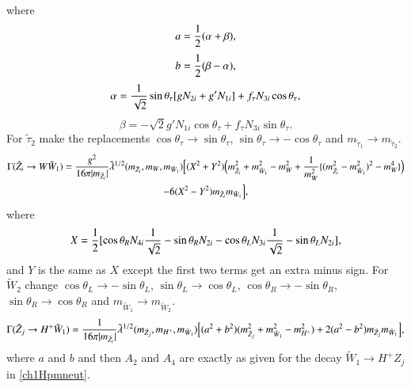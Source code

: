 \documentclass[final,3p,times]{elsarticle}
\begin{document}
where
\begin{equation}
a = {1 \over 2} (\alpha + \beta) ,
\end{equation}
\begin{equation}
b = {1 \over 2} (\beta - \alpha) ,
\end{equation}
\begin{equation}
\alpha = {1 \over \sqrt{2}} \sin \theta_\tau [g N_{2i} + g' N_{1i}] + f_\tau N_{3i} \cos \theta_\tau,
\end{equation}
\begin{equation}
\beta = -\sqrt{2} g' N_{1i} \cos \theta_\tau + f_\tau N_{3i} \sin \theta_\tau.
\end{equation}
For $\tilde{\tau}_2$ make the replacements $\cos\theta_\tau \rightarrow \sin\theta_\tau$, $\sin\theta_\tau \rightarrow -\cos\theta_\tau$ and $m_{\tilde{\tau}_1} \rightarrow m_{\tilde{\tau}_2}$.
\begin{multline}\label{neutWch1}
\Gamma (\tilde{Z}_i \rightarrow W \tilde{W}_{1}) = {g^2 \over 16\pi |m_{\tilde{Z}_i}|} \tilde{\lambda}^{1/2} (m_{\tilde{Z}_i}, m_W, m_{\tilde{W}_{1}}) \Big[(X^2 +Y^2) \Big(m_{\tilde{Z}_{i}}^2 + m_{\tilde{W}_1}^2 -m_W^2 + {1 \over m_W^2}\{(m_{\tilde{Z}_i}^2 - m_{\tilde{W}_1}^2)^2 - m_W^4\}\Big) \\ - 6(X^2 -Y^2)m_{\tilde{Z}_i}m_{\tilde{W}_1}\Big],
\end{multline} 
where
\begin{equation}
X = {1 \over 2}[\cos \theta_R N_{4i} {1 \over \sqrt{2}} - \sin \theta_R N_{2i} - \cos \theta_L N_{3i} {1 \over \sqrt{2}} - \sin \theta_L N_{2i}],
\end{equation}
and $Y$ is the same as $X$ except the first two terms get an extra minus sign. For $\tilde{W}_2$ change $\cos\theta_L \rightarrow -\sin\theta_L$, $\sin\theta_L \rightarrow \cos\theta_L$, $\cos\theta_R \rightarrow -\sin\theta_R$, $\sin\theta_R \rightarrow \cos\theta_R$ and $m_{\tilde{W}_1} \rightarrow m_{\tilde{W}_2}$.
\begin{equation}\label{neutHpmch1}
\Gamma (\tilde{Z}_j \rightarrow H^+ \tilde{W}_{1}) = {1 \over 16\pi |m_{\tilde{Z}_i}|} \tilde{\lambda}^{1/2} (m_{\tilde{Z}_j}, m_{H^+}, m_{\tilde{W}_{1}}) \Big[(a^2 +b^2) (m_{\tilde{Z}_{j}}^2 + m_{\tilde{W}_1}^2 -m_{H^+}^2) + 2(a^2 -b^2)m_{\tilde{Z}_j}m_{\tilde{W}_1}\Big],
\end{equation} 
where $a$ and $b$ and then $A_2$ and $A_4$ are exactly as given for the decay $\tilde{W}_1 \rightarrow H^+ Z_j$ in \eqref{ch1Hpmneut}.
\end{document}

